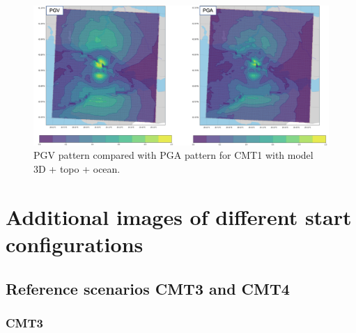 \documentclass[../Text/00main.tex]{subfiles}
\begin{document}
\begin{figure}
    \centering
    \includegraphics[width=\textwidth]{images_results/PGAVSPGV.png}
    \caption{PGV pattern compared with PGA pattern for CMT1 with model 3D + topo + ocean.}
    \label{figapp:pgapgvcompare}
\end{figure}

\FloatBarrier

\section{Additional images of different start configurations}{\label{app:morereffigs}}

\subsection{Reference scenarios CMT3 and CMT4}

\subsubsection{CMT3}
\end{document}
